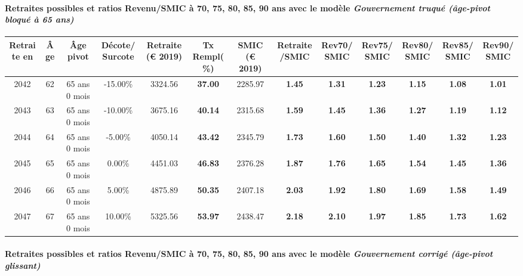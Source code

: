 \paragraph{Retraites possibles et ratios Revenu/SMIC à 70, 75, 80, 85, 90 ans avec le modèle \emph{Gouvernement truqué (âge-pivot bloqué à 65 ans)}}  
 
{ \scriptsize \begin{center} 
\begin{tabular}[htb]{|c|c||c|c||c|c||c||c|c|c|c|c|c|} 
\hline 
 Retraite en &  Âge &  Âge pivot &  Décote/Surcote &  Retraite (\euro{} 2019) &  Tx Rempl(\%) &  SMIC (\euro{} 2019) &  Retraite/SMIC &  Rev70/SMIC &  Rev75/SMIC &  Rev80/SMIC &  Rev85/SMIC &  Rev90/SMIC \\ 
\hline \hline 
 2042 &  62 &  65 ans 0 mois &  -15.00\% &  3324.56 &  {\bf 37.00} &  2285.97 &  {\bf 1.45} &  {\bf 1.31} &  {\bf 1.23} &  {\bf 1.15} &  {\bf 1.08} &  {\bf 1.01} \\ 
\hline 
 2043 &  63 &  65 ans 0 mois &  -10.00\% &  3675.16 &  {\bf 40.14} &  2315.68 &  {\bf 1.59} &  {\bf 1.45} &  {\bf 1.36} &  {\bf 1.27} &  {\bf 1.19} &  {\bf 1.12} \\ 
\hline 
 2044 &  64 &  65 ans 0 mois &  -5.00\% &  4050.14 &  {\bf 43.42} &  2345.79 &  {\bf 1.73} &  {\bf 1.60} &  {\bf 1.50} &  {\bf 1.40} &  {\bf 1.32} &  {\bf 1.23} \\ 
\hline 
 2045 &  65 &  65 ans 0 mois &  0.00\% &  4451.03 &  {\bf 46.83} &  2376.28 &  {\bf 1.87} &  {\bf 1.76} &  {\bf 1.65} &  {\bf 1.54} &  {\bf 1.45} &  {\bf 1.36} \\ 
\hline 
 2046 &  66 &  65 ans 0 mois &  5.00\% &  4875.89 &  {\bf 50.35} &  2407.18 &  {\bf 2.03} &  {\bf 1.92} &  {\bf 1.80} &  {\bf 1.69} &  {\bf 1.58} &  {\bf 1.49} \\ 
\hline 
 2047 &  67 &  65 ans 0 mois &  10.00\% &  5325.56 &  {\bf 53.97} &  2438.47 &  {\bf 2.18} &  {\bf 2.10} &  {\bf 1.97} &  {\bf 1.85} &  {\bf 1.73} &  {\bf 1.62} \\ 
\hline 
\hline 
\end{tabular} 
\end{center} } 
\paragraph{Retraites possibles et ratios Revenu/SMIC à 70, 75, 80, 85, 90 ans avec le modèle \emph{Gouvernement corrigé (âge-pivot glissant)}}  
 
